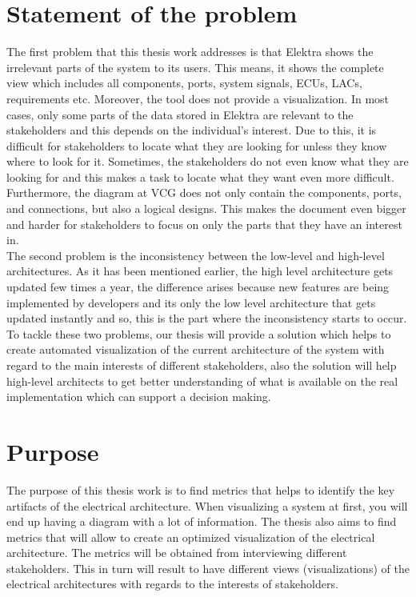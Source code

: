 \section{Statement of the problem} \label{Statement_ref}
The first problem that this thesis work addresses is that Elektra shows the irrelevant parts of the system to its users. This means, it shows the complete view which includes all components, ports, system signals, ECUs, LACs, requirements etc. Moreover, the tool does not provide a visualization. In most cases, only some parts of the data stored in Elektra are relevant to the stakeholders and this depends on the individual’s interest. Due to this, it is difficult for stakeholders to locate what they are looking for unless they know where to look for it. Sometimes, the stakeholders do not even know what they are looking for and this makes a task to locate what they want even more difficult. \\

Furthermore, the diagram at VCG does not only contain the components, ports, and connections, but also a logical designs. This makes the document even bigger and harder for stakeholders to focus on only the parts that they have an interest in. \\ 

The second problem is the inconsistency between the low-level and high-level architectures. As it has been mentioned earlier, the high level architecture gets updated few times a year, the difference arises because new features are being implemented by developers and its only the low level architecture that gets updated instantly and so, this is the part where the inconsistency starts to occur. \\ 

To tackle these two problems, our thesis will provide a solution which helps to create automated visualization of the current architecture of the system with regard to the main interests of different stakeholders, also the solution will help high-level architects to get better understanding of what is available on the real implementation which can support a decision making.


\section{Purpose} \label{Purpose_ref}
The purpose of this thesis work is to find metrics that helps to identify the key artifacts of the electrical architecture. When visualizing a system at first, you will end up having a diagram with a lot of information. The thesis also aims to find metrics that will allow to create an optimized visualization of the electrical architecture. The metrics will be obtained from interviewing different stakeholders. This in turn will result to have different views (visualizations) of the electrical architectures with regards to the interests of stakeholders. \\


